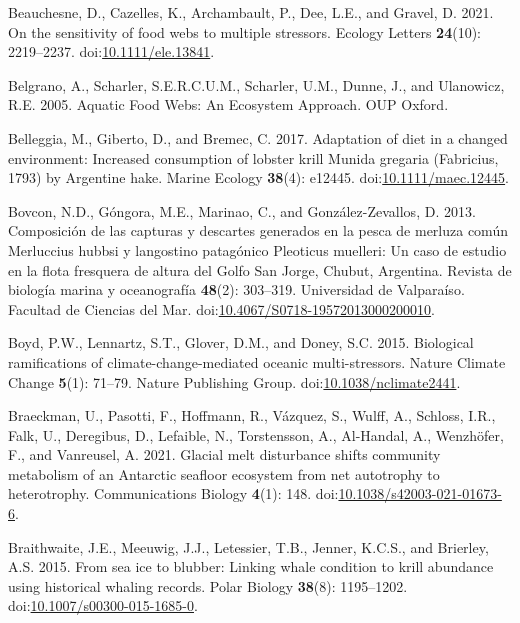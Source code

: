 \documentclass[
]{article}
\newlength{\cslhangindent}
\newenvironment{CSLReferences}[2] %
 {\begin{list}{}{%
  \setlength{\itemindent}{0pt}
  \setlength{\leftmargin}{0pt}
  \setlength{\parsep}{0pt}
  \ifodd #1
   \setlength{\leftmargin}{\cslhangindent}
   \setlength{\itemindent}{-1\cslhangindent}
  \fi
  \setlength{\itemsep}{#2\baselineskip}}}
 {\end{list}}
\begin{document}
\begin{CSLReferences}{1}{0}
Beauchesne, D., Cazelles, K., Archambault, P., Dee, L.E., and Gravel, D.
2021. On the sensitivity of food webs to multiple stressors. Ecology
Letters \textbf{24}(10): 2219--2237.
doi:\href{https://doi.org/10.1111/ele.13841}{10.1111/ele.13841}.

Belgrano, A., Scharler, S.E.R.C.U.M., Scharler, U.M., Dunne, J., and
Ulanowicz, R.E. 2005. Aquatic {Food Webs}: {An Ecosystem Approach}. OUP
Oxford.

Belleggia, M., Giberto, D., and Bremec, C. 2017. Adaptation of diet in a
changed environment: {Increased} consumption of lobster krill {Munida}
gregaria ({Fabricius}, 1793) by {Argentine} hake. Marine Ecology
\textbf{38}(4): e12445.
doi:\href{https://doi.org/10.1111/maec.12445}{10.1111/maec.12445}.

Bovcon, N.D., Góngora, M.E., Marinao, C., and González-Zevallos, D.
2013. Composici{ó}n de las capturas y descartes generados en la pesca de
merluza com{ú}n {Merluccius} hubbsi y langostino patag{ó}nico
{Pleoticus} muelleri: Un caso de estudio en la flota fresquera de altura
del {Golfo San Jorge}, {Chubut}, {Argentina}. Revista de biolog{í}a
marina y oceanograf{í}a \textbf{48}(2): 303--319. Universidad de
Valpara{í}so. Facultad de Ciencias del Mar.
doi:\href{https://doi.org/10.4067/S0718-19572013000200010}{10.4067/S0718-19572013000200010}.

Boyd, P.W., Lennartz, S.T., Glover, D.M., and Doney, S.C. 2015.
Biological ramifications of climate-change-mediated oceanic
multi-stressors. Nature Climate Change \textbf{5}(1): 71--79. Nature
Publishing Group.
doi:\href{https://doi.org/10.1038/nclimate2441}{10.1038/nclimate2441}.

Braeckman, U., Pasotti, F., Hoffmann, R., Vázquez, S., Wulff, A.,
Schloss, I.R., Falk, U., Deregibus, D., Lefaible, N., Torstensson, A.,
Al-Handal, A., Wenzhöfer, F., and Vanreusel, A. 2021. Glacial melt
disturbance shifts community metabolism of an {Antarctic} seafloor
ecosystem from net autotrophy to heterotrophy. Communications Biology
\textbf{4}(1): 148.
doi:\href{https://doi.org/10.1038/s42003-021-01673-6}{10.1038/s42003-021-01673-6}.

Braithwaite, J.E., Meeuwig, J.J., Letessier, T.B., Jenner, K.C.S., and
Brierley, A.S. 2015. From sea ice to blubber: Linking whale condition to
krill abundance using historical whaling records. Polar Biology
\textbf{38}(8): 1195--1202.
doi:\href{https://doi.org/10.1007/s00300-015-1685-0}{10.1007/s00300-015-1685-0}.


\end{CSLReferences}
\end{document}
